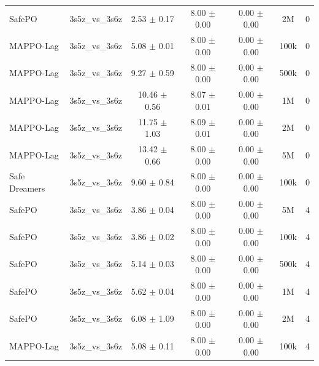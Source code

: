 \begin{longtable}{lcccccc}
SafePO & 3s5z\_vs\_3s6z & \textcolor{green!60!black}{2.53 $\pm$ 0.17} & \textcolor{green!60!black}{8.00 $\pm$ 0.00} & \textcolor{green!60!black}{0.00 $\pm$ 0.00} & 2M & 0 \\
MAPPO-Lag & 3s5z\_vs\_3s6z & \textcolor{green!60!black}{5.08 $\pm$ 0.01} & \textcolor{green!60!black}{8.00 $\pm$ 0.00} & \textcolor{green!60!black}{0.00 $\pm$ 0.00} & 100k & 0 \\
MAPPO-Lag & 3s5z\_vs\_3s6z & \textcolor{green!60!black}{9.27 $\pm$ 0.59} & \textcolor{green!60!black}{8.00 $\pm$ 0.00} & \textcolor{green!60!black}{0.00 $\pm$ 0.00} & 500k & 0 \\
MAPPO-Lag & 3s5z\_vs\_3s6z & \textcolor{red!70!black}{10.46 $\pm$ 0.56} & \textcolor{green!60!black}{8.07 $\pm$ 0.01} & \textcolor{green!60!black}{0.00 $\pm$ 0.00} & 1M & 0 \\
MAPPO-Lag & 3s5z\_vs\_3s6z & \textcolor{red!70!black}{11.75 $\pm$ 1.03} & \textcolor{green!60!black}{8.09 $\pm$ 0.01} & \textcolor{green!60!black}{0.00 $\pm$ 0.00} & 2M & 0 \\
MAPPO-Lag & 3s5z\_vs\_3s6z & \textcolor{red!70!black}{13.42 $\pm$ 0.66} & \textcolor{green!60!black}{8.00 $\pm$ 0.00} & \textcolor{green!60!black}{0.00 $\pm$ 0.00} & 5M & 0 \\
Safe Dreamers & 3s5z\_vs\_3s6z & 9.60 $\pm$ 0.84 & 8.00 $\pm$ 0.00 & 0.00 $\pm$ 0.00 & 100k & 0 \\
\midrule
SafePO & 3s5z\_vs\_3s6z & \textcolor{green!60!black}{3.86 $\pm$ 0.04} & \textcolor{green!60!black}{8.00 $\pm$ 0.00} & \textcolor{green!60!black}{0.00 $\pm$ 0.00} & 5M & 4 \\
SafePO & 3s5z\_vs\_3s6z & \textcolor{green!60!black}{3.86 $\pm$ 0.02} & \textcolor{green!60!black}{8.00 $\pm$ 0.00} & \textcolor{green!60!black}{0.00 $\pm$ 0.00} & 100k & 4 \\
SafePO & 3s5z\_vs\_3s6z & \textcolor{green!60!black}{5.14 $\pm$ 0.03} & \textcolor{green!60!black}{8.00 $\pm$ 0.00} & \textcolor{green!60!black}{0.00 $\pm$ 0.00} & 500k & 4 \\
SafePO & 3s5z\_vs\_3s6z & \textcolor{green!60!black}{5.62 $\pm$ 0.04} & \textcolor{green!60!black}{8.00 $\pm$ 0.00} & \textcolor{green!60!black}{0.00 $\pm$ 0.00} & 1M & 4 \\
SafePO & 3s5z\_vs\_3s6z & \textcolor{green!60!black}{6.08 $\pm$ 1.09} & \textcolor{green!60!black}{8.00 $\pm$ 0.00} & \textcolor{green!60!black}{0.00 $\pm$ 0.00} & 2M & 4 \\
MAPPO-Lag & 3s5z\_vs\_3s6z & \textcolor{green!60!black}{5.08 $\pm$ 0.11} & \textcolor{green!60!black}{8.00 $\pm$ 0.00} & \textcolor{green!60!black}{0.00 $\pm$ 0.00} & 100k & 4 \\

\end{longtable}
